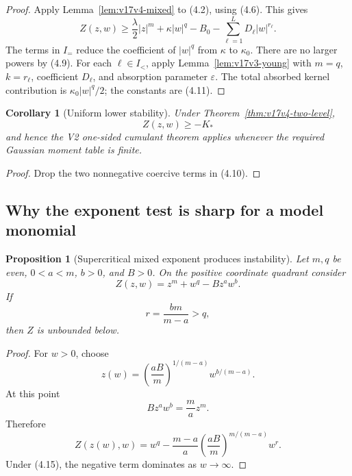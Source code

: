 \documentclass[11pt]{article}
\newtheorem{proposition}[theorem]{Proposition}
\newtheorem{corollary}[theorem]{Corollary}
\theoremstyle{remark}
\begin{document}
\begin{proof}
Apply Lemma~\ref{lem:v17v4-mixed} to (4.2), using (4.6).  This gives
\[
 Z(z,w)
 \geq
 \frac{\lambda}{2}|z|^m+
 \kappa|w|^q-B_0-\sum_{\ell=1}^LD_\ell|w|^{r_\ell}.
                                                               \tag{4.12}
\]
The terms in \(I_=\) reduce the coefficient of \(|w|^q\) from
\(\kappa\) to \(\kappa_0\).  There are no larger powers by (4.9).
For each \(\ell\in I_<\), apply
Lemma~\ref{lem:v17v3-young} with \(m=q\), \(k=r_\ell\),
coefficient \(D_\ell\), and absorption parameter \(\varepsilon\).
The total absorbed kernel contribution is \(\kappa_0|w|^q/2\);
the constants are (4.11).
\end{proof}

\begin{corollary}[Uniform lower stability]
\label{cor:v17v4-lower}
Under Theorem~\ref{thm:v17v4-two-level},
\[
 Z(z,w)\geq-K_*                                    \tag{4.13}
\]
and hence the V2 one-sided cumulant theorem applies whenever the
required Gaussian moment table is finite.
\end{corollary}

\begin{proof}
Drop the two nonnegative coercive terms in (4.10).
\end{proof}

\subsection{Why the exponent test is sharp for a model monomial}

\begin{proposition}[Supercritical mixed exponent produces
instability]
\label{prop:v17v4-supercritical}
Let \(m,q\) be even, \(0<a<m\), \(b>0\), and \(B>0\).  On the
positive coordinate quadrant consider
\[
 Z(z,w)=z^m+w^q-Bz^aw^b.                            \tag{4.14}
\]
If
\[
 r=\frac{bm}{m-a}>q,                               \tag{4.15}
\]
then \(Z\) is unbounded below.
\end{proposition}

\begin{proof}
For \(w>0\), choose
\[
 z(w)=
 \left(\frac{aB}{m}\right)^{1/(m-a)}
 w^{b/(m-a)}.                                      \tag{4.16}
\]
At this point
\[
 Bz^aw^b=\frac ma z^m.
\]
Therefore
\[
 Z(z(w),w)
 =
 w^q-\frac{m-a}{a}
 \left(\frac{aB}{m}\right)^{m/(m-a)}
 w^r.                                               \tag{4.17}
\]
Under (4.15), the negative term dominates as \(w\to\infty\).
\end{proof}
\end{document}
